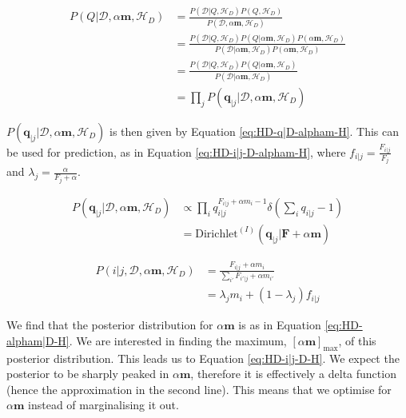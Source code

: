 \begin{align}
P(Q|\mathcal{D},\alpha\boldsymbol{m},\mathscr{H}_{D})&=\frac{P(\mathcal{D}|Q,\mathscr{H}_{D})P(Q,\mathscr{H}_{D})}{P(\mathcal{D},\alpha \boldsymbol{m},\mathscr{H}_{D})}\nonumber
\\
&=\frac{P(\mathcal{D}|Q,\mathscr{H}_{D})P(Q|\alpha\boldsymbol{m},\mathscr{H}_{D})P(\alpha\boldsymbol{m},\mathscr{H}_{D})}{P(\mathcal{D}|\alpha\boldsymbol{m},\mathscr{H}_{D})P(\alpha\boldsymbol{m},\mathscr{H}_{D})}\nonumber
\\
&=\frac{P(\mathcal{D}|Q,\mathscr{H}_{D})P(Q|\alpha\boldsymbol{m},\mathscr{H}_{D})}{P(\mathcal{D}|\alpha\boldsymbol{m},\mathscr{H}_{D})} \nonumber
\\
&=\prod_{j}P(\boldsymbol{q}_{|j}|\mathcal{D},\alpha\boldsymbol{m},\mathscr{H}_{D})
\label{eq:HD-Q|D-alpham-H}
\end{align}

\noindent $P(\boldsymbol{q}_{|j}|\mathcal{D},\alpha\boldsymbol{m},\mathscr{H}_{D})$ is then given by Equation \ref{eq:HD-q|D-alpham-H}. This can be used for prediction, as in Equation \ref{eq:HD-i|j-D-alpham-H}, where $f_{i|j}=\frac{F_{i|j}}{F_{j}}$ and $\lambda_{j}=\frac{\alpha}{F_{j}+\alpha}$.


\begin{align}
P(\boldsymbol{q}_{|j}|\mathcal{D},\alpha\boldsymbol{m},\mathscr{H}_{D})&\propto\prod_{i}q_{i|j}^{F_{i|j}+\alpha m_{i}-1}\delta(\sum_{i}q_{i|j}-1) \nonumber
\\
&=\text{Dirichlet}^{(I)}(\boldsymbol{q}_{|j}|\boldsymbol{F}+\alpha\boldsymbol{m})
\label{eq:HD-q|D-alpham-H}
\end{align}

\begin{align}
P(i|j,\mathcal{D},\alpha\boldsymbol{m},\mathscr{H}_{D})&=\frac{F_{i|j}+\alpha m_{i}}{\sum_{i'}F_{i'|j}+\alpha m_{i'}} \nonumber
\\
&=\lambda_{j}m_{i}+(1-\lambda_{j})f_{i|j}
\label{eq:HD-i|j-D-alpham-H}
\end{align}

We find that the posterior distribution for $\alpha\boldsymbol{m}$ is as in Equation \ref{eq:HD-alpham|D-H}. We are interested in finding the maximum, $[\alpha\boldsymbol{m}]_{\text{max}}$, of this posterior distribution. This leads us to Equation \ref{eq:HD-i|j-D-H}. We expect the posterior to be sharply peaked in $\alpha\boldsymbol{m}$, therefore it is effectively a delta function (hence the approximation in the second line). This means that we optimise for $\alpha\boldsymbol{m}$ instead of marginalising it out. 

